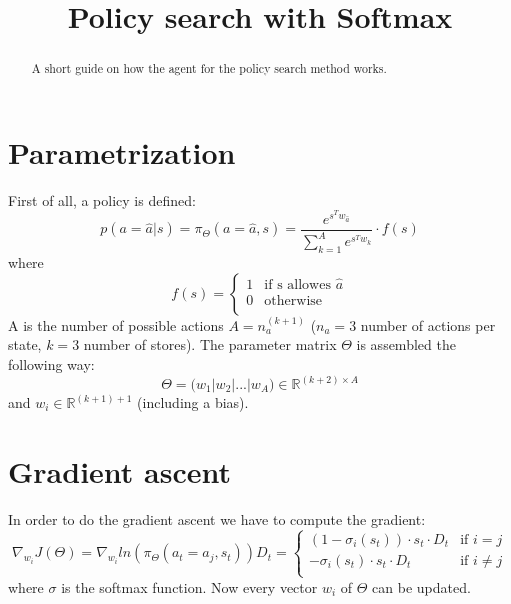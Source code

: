 \documentclass{article}
\begin{document}
\title{Policy search with Softmax}
\maketitle

\begin{abstract}
A short guide on how the agent for the policy search method works.
\end{abstract}

\section{Parametrization}
First of all, a policy is defined:
\begin{equation}
    \label{simple_equation}
    p( a = \hat{a}| s) = \pi_\Theta(a = \hat{a},s) = \frac{e^{s^T w_{\hat{a}}}}{\sum_{k=1}^{A} e^{s^T w_k}} \cdot f(s)
\end{equation}
where 
\begin{equation}
   f(s) =
   \begin{cases}
     1 & \text{if s allowes $\hat{a}$} \\
     0 & \text{otherwise} \\ 
   \end{cases}
\end{equation}
A is the number of possible actions $A = n_a^{(k+1)}$ ($n_a=3$  number of actions per state, $k=3$ number of stores). The parameter matrix $\Theta$ is assembled the following way:
\begin{equation}
	\Theta = \big(w_1|w_2|...|w_A\big) \in \mathbb{R}^{(k+2) \times A }
\end{equation}
and $w_i \in \mathbb{R}^{(k+1)+1}$ (including a bias).



\section{Gradient ascent}
In order to do the gradient ascent we have to compute the gradient:
\begin{equation}
	\nabla_{w_i}J(\Theta) = \nabla_{w_i} ln(\pi_\Theta(a_t = a_j,s_t))D_t =
	\begin{cases}
     (1-\sigma_i(s_t))\cdot s_t\cdot D_t  & \text{if $i = j$} \\
     -\sigma_i(s_t) \cdot s_t \cdot D_t & \text{if $i \neq  j$} \\ 
    \end{cases}
\end{equation}
where $\sigma$ is the softmax function.
Now every vector $w_i$ of $\Theta$ can be updated.
\end{document}
